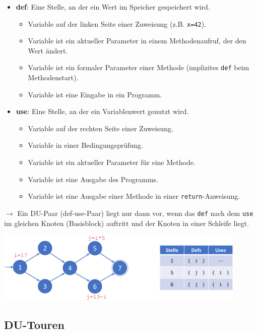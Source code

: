 \documentclass[11pt, a4paper]{article}
\begin{document}
\begin{itemize}
    \item \textbf{def}: Eine Stelle, an der ein Wert im Speicher gespeichert wird.
    \begin{itemize}
        \item Variable auf der linken Seite einer Zuweisung (z.B. \texttt{x=42}).
        \item Variable ist ein aktueller Parameter in einem Methodenaufruf, der den Wert ändert.
        \item Variable ist ein formaler Parameter einer Methode (implizites \texttt{def} beim Methodenstart).
        \item Variable ist eine Eingabe in ein Programm.
    \end{itemize}
    \item \textbf{use}: Eine Stelle, an der ein Variablenwert genutzt wird.
    \begin{itemize}
        \item Variable auf der rechten Seite einer Zuweisung.
        \item Variable in einer Bedingungsprüfung.
        \item Variable ist ein aktueller Parameter für eine Methode.
        \item Variable ist eine Ausgabe des Programms.
        \item Variable ist eine Ausgabe einer Methode in einer \texttt{return}-Anweisung.
    \end{itemize}
\end{itemize}

$\rightarrow$ Ein DU-Paar (def-use-Paar) liegt nur dann vor, wenn das \texttt{def} nach dem \texttt{use} im gleichen Knoten (Basisblock) auftritt und der Knoten in einer Schleife liegt.

\vspace{1em}

\centering \includegraphics[width=0.9\textwidth]{Graphen-14.png} 

\raggedright

\newpage

\subsection{DU-Touren}
\end{document}
